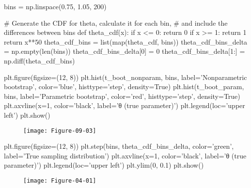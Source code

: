 \begin{python}
bins = np.linspace(0.75, 1.05, 200)
\end{python}

\begin{python}
# Generate the CDF for theta, calculate it for each bin, 
# and include the differences between bins
def theta_cdf(x):
    if x <= 0:
        return 0
    if x >= 1:
        return 1
    return x**50
theta_cdf_bins = list(map(theta_cdf, bins))
theta_cdf_bins_delta = np.empty(len(bins))
theta_cdf_bins_delta[0] = 0
theta_cdf_bins_delta[1:] = np.diff(theta_cdf_bins)
\end{python}

\begin{python}
plt.figure(figsize=(12, 8))
plt.hist(t_boot_nonparam, bins, label='Nonparametric bootstrap', color='blue', 
         histtype='step', density=True)
plt.hist(t_boot_param, bins, label='Parametric bootstrap', color='red', 
         histtype='step', density=True)
plt.axvline(x=1, color='black', label='θ (true parameter)')
plt.legend(loc='upper left')
plt.show()
\end{python}

\begin{figure}[H]
\centering
\texttt{[image: Figure-09-03]}
\end{figure}


\begin{python}
plt.figure(figsize=(12, 8))
plt.step(bins, theta_cdf_bins_delta, color='green', label='True sampling distribution')
plt.axvline(x=1, color='black', label='θ (true parameter)')
plt.legend(loc='upper left')
plt.ylim(0, 0.1)
plt.show()
\end{python}

\begin{figure}[H]
\centering
\texttt{[image: Figure-04-01]}
\end{figure}

